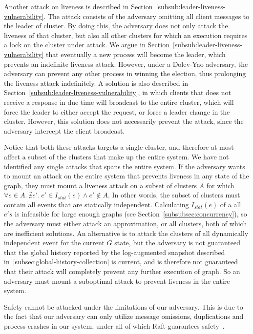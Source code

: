 \documentclass{article}
\begin{document}
		Another attack on liveness is described in Section~\ref{subsub:leader-liveness-vulnerability}.
		The attack consists of the adversary omitting all client messages to the leader of cluster.
		By doing this, the adversary does not only attack the liveness of that cluster, but also all other clusters for which an execution requires a lock on the cluster under attack.
		We argue in Section~\ref{subsub:leader-liveness-vulnerability} that eventually a new process will become the leader, which prevents an indefinite liveness attack.
		However, under a Dolev-Yao adversary, the adversary can prevent any other process in winning the election, thus prolonging the liveness attack indefinitely.
		A solution is also described in Section~\ref{subsub:leader-liveness-vulnerability}, in which clients that does not receive a response in due time will broadcast to the entire cluster, which will force the leader to either accept the request, or force a leader change in the cluster.
		However, this solution does not necessarily prevent the attack, since the adversary intercept the client broadcast.

		Notice that both these attacks targets a single cluster, and therefore at most affect a subset of the clusters that make up the entire system.
		We have not identified any single attacks that spans the entire system.
		If the adversary wants to mount an attack on the entire system that prevents liveness in any state of the graph, they must mount a liveness attack on a subset of clusters $A$ for which $\forall e \in A.\ \nexists e'.\ e' \in I_{stat}(e) \land e' \not \in A$.
		In other words, the subset of clusters must contain all events that are statically independent.
		Calculating $I_{stat}(e)$ of a all $e's$ is infeasible for large enough graphs (see Section~\ref{subsubsec:concurrency}), so the adversary must either attack an approximation, or all clusters, both of which are inefficient solutions.
		An alternative is to attack the clusters of all dynamically independent event for the current $G$ state, but the adversary is not guaranteed that the global history reported by the log-augmented snapshot described in~\ref{subsec:global-history-collection} is current, and is therefore not guaranteed that their attack will completely prevent any further execution of graph.
		So an adversary must mount a suboptimal attack to prevent liveness in the entire system.

		Safety cannot be attacked under the limitations of our adversary.
        This is due to the fact that our adversary can only utilize message omissions, duplications and process crashes in our system, under all of which Raft guarantees safety~\cite{ongaro_search_2014}.
\end{document}

